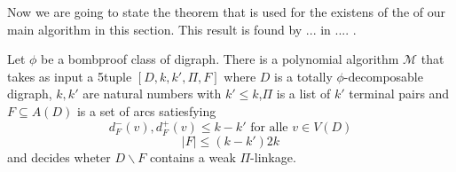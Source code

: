 \begin{figure}
    \centering
\end{figure}
Now we are going to state the theorem that is used for the existens of the of our main algorithm in this section. 
This result is found by ... in .... .
\begin{thm}
    Let $\phi$ be a bombproof class of digraph. There is a polynomial algorithm $\mathcal{M}$ that takes as input a 5tuple $[D,k,k',\Pi,F]$ where $D$ is a totally $\phi$-decomposable digraph, $k,k'$ are natural numbers with $k'\leq k$,$\Pi$ is a list of $k'$ terminal pairs and $F\subseteq A(D)$ is a set of arcs satiesfying 
    \begin{equation}
        d_F^-(v),d_F^+(v)\leq k-k' \text{ for alle } v\in V(D)
    \end{equation}
    \begin{equation*}
        |F|\leq (k-k')2k
    \end{equation*}
    and decides wheter $D\backslash F$ contains a weak $\Pi$-linkage.
    \label{thm:mainalgo}
\end{thm}
   
